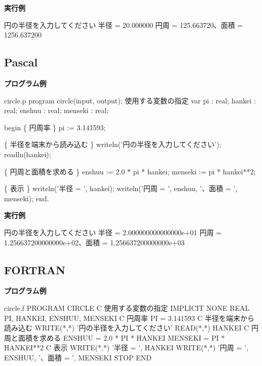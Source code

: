 \noindent
\textbf{実行例}

\begin{progls}
円の半径を入力してください
半径 = 20.000000
円周 = 125.663720、面積 = 1256.637200
%
\end{progls}

\subsection{Pascal}

\noindent
\textbf{プログラム例}

\begin{progls2}{circle.p}
program circle(input, output);
{ 使用する変数の指定 }
var pi     : real;
   hankei  : real;
   enshuu  : real;
   menseki : real;

begin
   \{ 円周率 \}
   pi := 3.141593;

   \{ 半径を端末から読み込む \}
   writeln('円の半径を入力してください');
   readln(hankei);

   \{ 円周と面積を求める \}
   enshuu := 2.0 * pi * hankei;
   menseki := pi * hankei**2;

   \{ 表示 \}
   writeln('半径 = ', hankei);
   writeln('円周 = ', enshuu, '、面積 = ', menseki);
end.
\end{progls2}

\newpage

\noindent
\textbf{実行例}

\begin{progls}
円の半径を入力してください
半径 =  2.000000000000000e+01
円周 =  1.256637200000000e+02、面積 =  1.256637200000000e+03
%
\end{progls}

\subsection{FORTRAN}

\noindent
\textbf{プログラム例}

\begin{progls2}{circle.f}
      PROGRAM CIRCLE
C 使用する変数の指定
      IMPLICIT NONE
      REAL PI, HANKEI, ENSHUU, MENSEKI
C 円周率
      PI = 3.141593
C 半径を端末から読み込む
      WRITE(*,*) '円の半径を入力してください'
      READ(*,*) HANKEI
C 円周と面積を求める
      ENSHUU = 2.0 * PI * HANKEI
      MENSEKI = PI * HANKEI**2
C 表示
      WRITE(*,*) '半径 = ', HANKEI
      WRITE(*,*) '円周 = ', ENSHUU, '、面積 = ', MENSEKI
      STOP
      END
\end{progls2}

